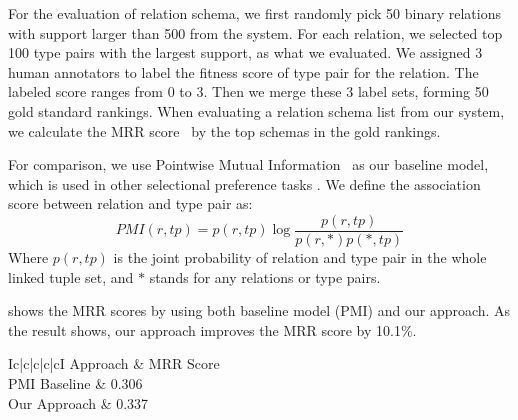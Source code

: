 For the evaluation of relation schema, we first randomly pick
50 binary relations with support larger than 500 from the system.
For each relation, we selected top 100 type pairs with the largest
support, as what we evaluated.
We assigned 3 human annotators to label the fitness score of type
pair for the relation. The labeled score ranges from 0 to 3.
Then we merge these 3 label sets, forming 50 gold standard rankings.
When evaluating a relation schema list from our system,
we calculate the MRR score~\cite{liu2009learning} by the top schemas in the gold rankings.

For comparison, we use Pointwise Mutual Information~\cite{church1990word}
as our baseline model, which is
used in other selectional preference tasks \cite{resnik1996selectional}.
We define the association score between relation and type pair as:
\begin{equation}
PMI(r, tp) = p(r, tp) \log \frac {p(r, tp)}{p(r, *) p(*, tp)}
\end{equation}
Where $p(r, tp)$ is the joint probability of relation and type pair in the whole linked
tuple set, and $*$ stands for any relations or type pairs.


 shows the MRR scores by using both baseline model (PMI) and our approach.
As the result shows, our approach improves the MRR score by 10.1\%.

\begin{table}[ht]
\small
	\centering
	\caption{End-to-end Schema Inference Results}
	\begin{tabular}{Ic|c|c|c|cI}
        \whline
		Approach & MRR Score \\
        \whline
        PMI Baseline & 0.306 \\
        \hline
        Our Approach & 0.337 \\
        \whline
	\end{tabular}%
	\label{tab:precision}%
\end{table}



